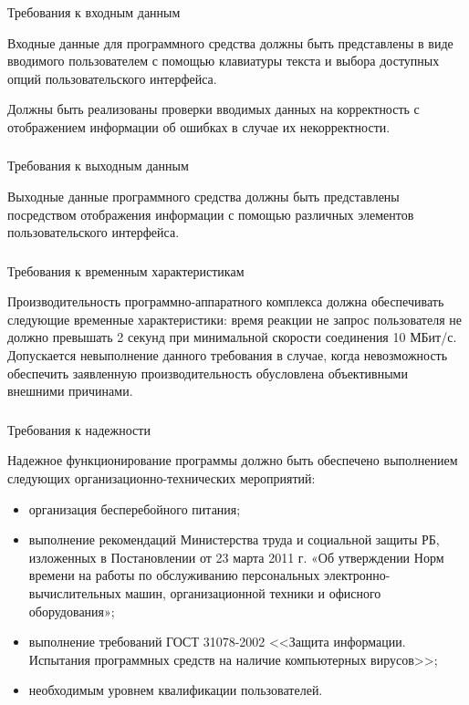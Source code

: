 \subsubsection{} Требования к входным данным
\label{sec:analysis:specification:inputs}

Входные данные для программного средства должны быть представлены в виде вводимого пользователем с помощью клавиатуры
текста и выбора доступных опций пользовательского интерфейса.

Должны быть реализованы проверки вводимых данных на корректность с отображением информации об ошибках в случае их
некорректности.

\subsubsection{} Требования к выходным данным
\label{sec:analysis:specification:outputs}

Выходные данные программного средства должны быть представлены посредством отображения информации с помощью различных
элементов пользовательского интерфейса.

\subsubsection{} Требования к временным характеристикам
\label{sec:analysis:specification:timing}

Производительность программно-аппаратного комплекса должна обеспечивать следующие временные характеристики: время
реакции не запрос пользователя не должно превышать 2 секунд при минимальной скорости соединения 10 МБит/с. Допускается
невыполнение данного требования в случае, когда невозможность обеспечить заявленную производительность обусловлена
объективными внешними причинами.

\subsubsection{} Требования к надежности
\label{sec:analysis:specification:reliability}

Надежное функционирование программы должно быть обеспечено выполнением следующих организационно-технических мероприятий:

\begin{itemize}
	\item организация бесперебойного питания;
	\item выполнение рекомендаций Министерства труда и социальной защиты РБ, изложенных в Постановлении от 23 марта 2011 г. «Об утверждении Норм времени на работы по обслуживанию персональных электронно-вы\-числи\-тельных машин, организационной техники и офисного оборудования»;
	\item выполнение требований ГОСТ 31078-2002 <<Защита информации. Испытания программных средств на наличие компьютерных вирусов>>;
	\item необходимым уровнем квалификации пользователей.
\end{itemize}


